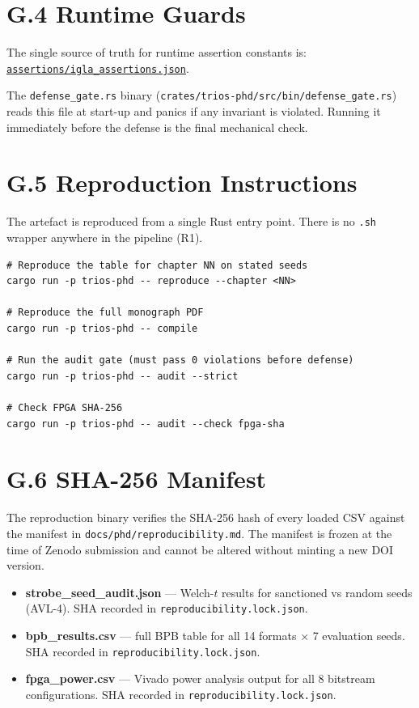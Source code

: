 \section*{G.4 Runtime Guards}

The single source of truth for runtime assertion constants is:
\href{https://github.com/gHashTag/trios/blob/main/assertions/igla\_assertions.json}
  {\texttt{assertions/igla\_assertions.json}}.

The \texttt{defense\_gate.rs} binary (\texttt{crates/trios-phd/src/bin/defense\_gate.rs})
reads this file at start-up and panics if any invariant is violated. Running it
immediately before the defense is the final mechanical check.

\section*{G.5 Reproduction Instructions}

The artefact is reproduced from a single Rust entry point. There is no
\texttt{.sh} wrapper anywhere in the pipeline (R1).

\begin{verbatim}
# Reproduce the table for chapter NN on stated seeds
cargo run -p trios-phd -- reproduce --chapter <NN>

# Reproduce the full monograph PDF
cargo run -p trios-phd -- compile

# Run the audit gate (must pass 0 violations before defense)
cargo run -p trios-phd -- audit --strict

# Check FPGA SHA-256
cargo run -p trios-phd -- audit --check fpga-sha
\end{verbatim}

\section*{G.6 SHA-256 Manifest}

The reproduction binary verifies the SHA-256 hash of every loaded CSV against
the manifest in \texttt{docs/phd/reproducibility.md}. The manifest is
frozen at the time of Zenodo submission and cannot be altered without
minting a new DOI version.

\begin{itemize}
  \item \textbf{strobe\_seed\_audit.json} — Welch-$t$ results for sanctioned
    vs random seeds (AVL-4). SHA recorded in \texttt{reproducibility.lock.json}.
  \item \textbf{bpb\_results.csv} — full BPB table for all 14 formats ×
    7 evaluation seeds. SHA recorded in \texttt{reproducibility.lock.json}.
  \item \textbf{fpga\_power.csv} — Vivado power analysis output for all
    8 bitstream configurations. SHA recorded in \texttt{reproducibility.lock.json}.
\end{itemize}


